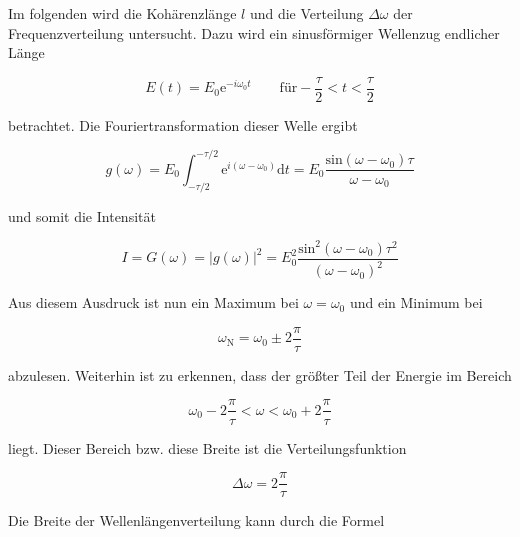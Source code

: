         \noindent Im folgenden wird die Kohärenzlänge $l$ und die Verteilung $\Delta \omega$ der Frequenzverteilung untersucht. 
        Dazu wird ein sinusförmiger Wellenzug endlicher Länge

        \begin{equation*}
            E(t) = E_0 \text{e}^{-i \omega_0 t} \quad \quad \text{für} -\frac{\tau}{2} < t < \frac{\tau}{2} \nonumber
        \end{equation*}

        \noindent betrachtet. Die Fouriertransformation dieser Welle ergibt

        \begin{equation}
            g(\omega) = E_0 \int_{-\tau / 2}^{-\tau /2} \text{e}^{i(\omega - \omega_0)} \text{d}t = E_0 
            \frac{\text{sin}(\omega - \omega_0) \tau}{\omega - \omega_0} \nonumber
        \end{equation}

        \noindent und somit die Intensität

        \begin{equation*}
            I = G(\omega) = |g(\omega)|^2 = E_0^2 
            \frac{\text{sin}^2(\omega - \omega_0) \tau^2}{(\omega - \omega_0)^2} \nonumber
        \end{equation*}

        \noindent Aus diesem Ausdruck ist nun ein Maximum bei $\omega = \omega_0$ und ein Minimum bei
    
        \begin{equation}
            \omega_{\text{N}} = \omega_0 \pm 2\frac{\pi}{\tau}          \nonumber     
        \end{equation}

        \noindent abzulesen. Weiterhin ist zu erkennen, dass der größter Teil der Energie im Bereich 

        \begin{equation}
            \omega_0 - 2\frac{\pi}{\tau} < \omega < \omega_0 + 2\frac{\pi}{\tau}    \nonumber 
        \end{equation}

        \noindent liegt. Dieser Bereich bzw. diese Breite ist die Verteilungsfunktion 

        \begin{equation}
            \Delta \omega = 2 \frac{\pi}{\tau}
            \label{eqn:1}
        \end{equation}

        \noindent Die Breite der Wellenlängenverteilung kann durch die Formel 


